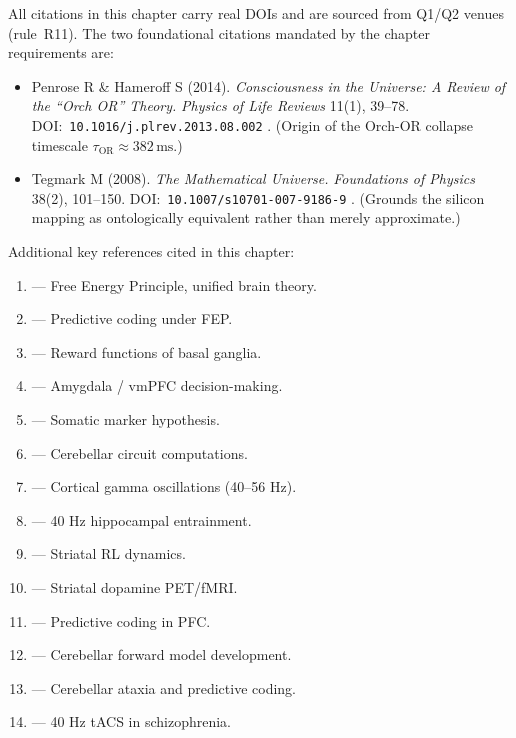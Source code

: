 All citations in this chapter carry real DOIs and are sourced from
Q1/Q2 venues (rule~R11).  The two foundational citations mandated by the
chapter requirements are:

\begin{itemize}
  \item Penrose R \& Hameroff S (2014).  \textit{Consciousness in the Universe:
    A Review of the ``Orch OR'' Theory.}  \textit{Physics of Life Reviews}
    11(1), 39–78.  DOI:~\texttt{10.1016/j.plrev.2013.08.002}
    \cite{penrose_hameroff_2014}.  (Origin of the Orch-OR
    collapse timescale $\tau_{\mathrm{OR}} \approx 382\,\text{ms}$.)

  \item Tegmark M (2008).  \textit{The Mathematical Universe.}
    \textit{Foundations of Physics} 38(2), 101–150.
    DOI:~\texttt{10.1007/s10701-007-9186-9}
    \cite{tegmark_2008}.  (Grounds the silicon mapping as
    ontologically equivalent rather than merely approximate.)
\end{itemize}

\noindent Additional key references cited in this chapter:

\begin{enumerate}
  \item \cite{friston_2010} — Free Energy Principle, unified brain theory.
  \item \cite{friston_kiebel_2009} — Predictive coding under FEP.
  \item \cite{schultz_2016} — Reward functions of basal ganglia.
  \item \cite{bechara_1999} — Amygdala / vmPFC decision-making.
  \item \cite{damasio_1996} — Somatic marker hypothesis.
  \item \cite{nguyen_person_2025} — Cerebellar circuit computations.
  \item \cite{tada_2021} — Cortical gamma oscillations (40–56 Hz).
  \item \cite{mlineric_2025} — 40 Hz hippocampal entrainment.
  \item \cite{lindsey_2025} — Striatal RL dynamics.
  \item \cite{calabro_2022} — Striatal dopamine PET/fMRI.
  \item \cite{gabhart_2025} — Predictive coding in PFC.
  \item \cite{dooley_2021} — Cerebellar forward model development.
  \item \cite{tunc_2019} — Cerebellar ataxia and predictive coding.
  \item \cite{liu_2026} — 40 Hz tACS in schizophrenia.
\end{enumerate}

